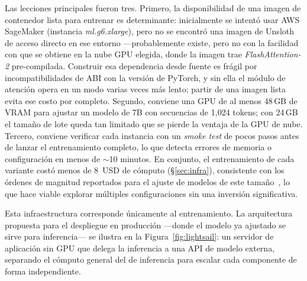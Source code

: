 \documentclass[10pt,twocolumn]{article}
\begin{document}
Las lecciones principales fueron tres. Primero, la disponibilidad de una imagen de contenedor lista para entrenar es determinante: inicialmente se intent\'o usar AWS SageMaker (instancia \textit{ml.g6.xlarge}), pero no se encontr\'o una imagen de Unsloth~\cite{unsloth2026} de acceso directo en ese entorno ---probablemente existe, pero no con la facilidad con que se obtiene en la nube GPU elegida, donde la imagen trae \textit{FlashAttention-2} pre-compilada. Construir esa dependencia desde fuente es fr\'agil por incompatibilidades de ABI con la versi\'on de PyTorch, y sin ella el m\'odulo de atenci\'on opera en un modo varias veces m\'as lento; partir de una imagen lista evita ese costo por completo. Segundo, conviene una GPU de al menos 48\,GB de VRAM para ajustar un modelo de 7B con secuencias de 1{,}024 tokens; con 24\,GB el tama\~no de lote queda tan limitado que se pierde la ventaja de la GPU de nube. Tercero, conviene verificar cada instancia con un \textit{smoke test} de pocos pasos antes de lanzar el entrenamiento completo, lo que detecta errores de memoria o configuraci\'on en menos de $\sim$10 minutos. En conjunto, el entrenamiento de cada variante cost\'o menos de 8~USD de c\'omputo (\S\ref{sec:infra}), consistente con los \'ordenes de magnitud reportados para el ajuste de modelos de este tama\~no~\cite{mitrasish2026}, lo que hace viable explorar m\'ultiples configuraciones sin una inversi\'on significativa.

Esta infraestructura corresponde \'unicamente al entrenamiento. La arquitectura propuesta para el despliegue en producci\'on ---donde el modelo ya ajustado se sirve para inferencia--- se ilustra en la Figura~\ref{fig:lightsail}: un servidor de aplicaci\'on sin GPU que delega la inferencia a una API de modelo externa, separando el c\'omputo general del de inferencia para escalar cada componente de forma independiente.
\end{document}
